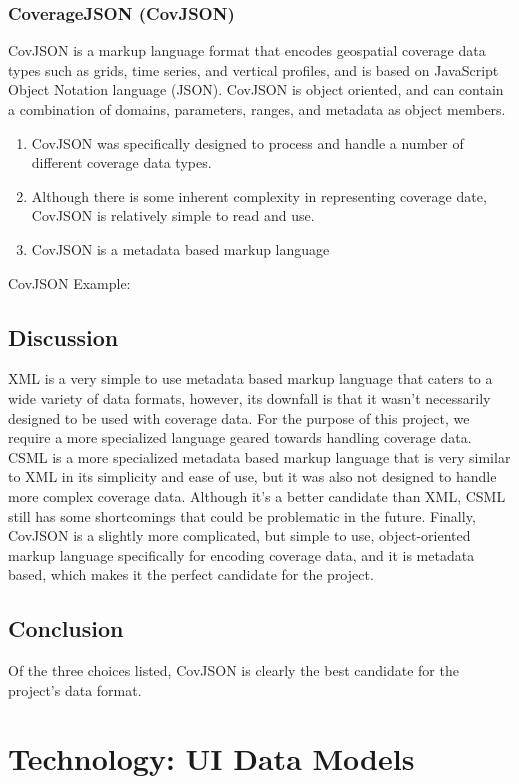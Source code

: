 \documentclass[onecolumn, draftclsnofoot,10pt, compsoc]{IEEEtran}
\begin{document}
\subsubsection{CoverageJSON (CovJSON)}
CovJSON is a markup language format that encodes geospatial coverage data types such as grids, time series, and vertical profiles, and is based on JavaScript Object Notation language (JSON). CovJSON is object oriented, and can contain a combination of domains, parameters, ranges, and metadata as object members.
\begin{enumerate}
\item CovJSON was specifically designed to process and handle a number of different coverage data types.
\item Although there is some inherent complexity in representing coverage date, CovJSON is relatively simple to read and use.
\item CovJSON is a metadata based markup language
\end{enumerate}

CovJSON Example:


\subsection{Discussion}
XML is a very simple to use metadata based markup language that caters to a wide variety of data formats, however, its downfall is that it wasn’t necessarily designed to be used with coverage data. For the purpose of this project, we require a more specialized language geared towards handling coverage data. CSML is a more specialized metadata based markup language that is very similar to XML in its simplicity and ease of use, but it was also not designed to handle more complex coverage data. Although it’s a better candidate than XML, CSML still has some shortcomings that could be problematic in the future. Finally, CovJSON is a slightly more complicated, but simple to use, object-oriented markup language specifically for encoding coverage data, and it is metadata based, which makes it the perfect candidate for the project.

\subsection{Conclusion}
Of the three choices listed, CovJSON is clearly the best candidate for the project’s data format.

\section{Technology: UI Data Models}
\end{document}
